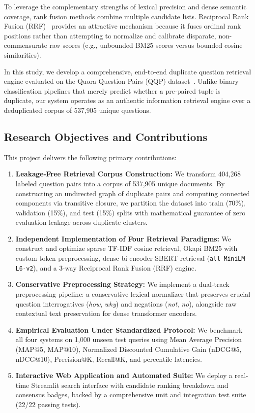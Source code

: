 \documentclass[11pt,a4paper]{article}
\begin{document}
To leverage the complementary strengths of lexical precision and dense semantic coverage, rank fusion methods combine multiple candidate lists. Reciprocal Rank Fusion (RRF)~\cite{cormack2009reciprocal} provides an attractive mechanism because it fuses ordinal rank positions rather than attempting to normalize and calibrate disparate, non-commensurate raw scores (e.g., unbounded BM25 scores versus bounded cosine similarities).

In this study, we develop a comprehensive, end-to-end duplicate question retrieval engine evaluated on the Quora Question Pairs (QQP) dataset~\cite{iyer2017quora}. Unlike binary classification pipelines that merely predict whether a pre-paired tuple is duplicate, our system operates as an authentic information retrieval engine over a deduplicated corpus of 537,905 unique questions.

\subsection{Research Objectives and Contributions}
This project delivers the following primary contributions:
\begin{enumerate}[noitemsep,topsep=2pt]
    \item \textbf{Leakage-Free Retrieval Corpus Construction:} We transform 404,268 labeled question pairs into a corpus of 537,905 unique documents. By constructing an undirected graph of duplicate pairs and computing connected components via transitive closure, we partition the dataset into train (70\%), validation (15\%), and test (15\%) splits with mathematical guarantee of zero evaluation leakage across duplicate clusters.
    \item \textbf{Independent Implementation of Four Retrieval Paradigms:} We construct and optimize sparse TF-IDF cosine retrieval, Okapi BM25 with custom token preprocessing, dense bi-encoder SBERT retrieval (\texttt{all-MiniLM-L6-v2}), and a 3-way Reciprocal Rank Fusion (RRF) engine.
    \item \textbf{Conservative Preprocessing Strategy:} We implement a dual-track preprocessing pipeline: a conservative lexical normalizer that preserves crucial question interrogatives (\textit{how}, \textit{why}) and negations (\textit{not}, \textit{no}), alongside raw contextual text preservation for dense transformer encoders.
    \item \textbf{Empirical Evaluation Under Standardized Protocol:} We benchmark all four systems on 1,000 unseen test queries using Mean Average Precision (MAP@5, MAP@10), Normalized Discounted Cumulative Gain (nDCG@5, nDCG@10), Precision@K, Recall@K, and percentile latencies.
    \item \textbf{Interactive Web Application and Automated Suite:} We deploy a real-time Streamlit search interface with candidate ranking breakdown and consensus badges, backed by a comprehensive unit and integration test suite (22/22 passing tests).
\end{enumerate}
\end{document}
